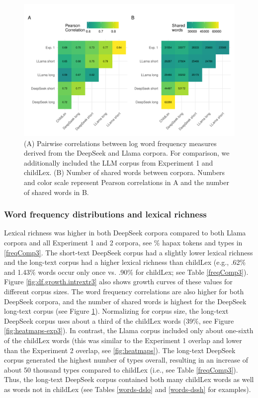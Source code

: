 \documentclass[doc, a4paper, anonymous]{apa7}
\begin{document}
\begin{figure}[!htbp]
  \centerline{
    \includegraphics[width=1.1\textwidth]{figures/combined_plotc_exp3.pdf}}
    \caption{(A) Pairwise correlations between log word frequency measures derived from the DeepSeek and Llama corpora. For comparison, we additionally included the LLM corpus from Experiment 1 and childLex. (B) Number of shared words between corpora. Numbers and color scale represent Pearson correlations in A and the number of shared words in B.}
    \label{fig:combined_plotc_exp3}
\end{figure}


\subsubsection*{Word frequency distributions and lexical richness}

Lexical richness was higher in both DeepSeek corpora compared to both Llama corpora and all Experiment 1 and 2 corpora, see \% hapax tokens and types in \ref{freqComp3}. The short-text DeepSeek corpus had a slightly lower lexical richness and the long-text corpus had a higher lexical richness than childLex (e.g., .62\% and 1.43\% words occur only once vs. .90\% for childLex; see Table \ref{freqComp3}). Figure \ref{fig:df.growth.intrextr3} also shows growth curves of these values for different corpus sizes. The word frequency correlations are also higher for both DeepSeek corpora, and the number of shared words is highest for the DeepSeek long-text corpus (see Figure \ref{fig:combined_plotc_exp3}). Normalizing for corpus size, the long-text DeepSeek corpus uses about a third of the childLex words (39\%, see Figure \ref{fig:heatmaps-exp3}). In contrast, the Llama corpus included only about one-sixth of the childLex words (this was similar to the Experiment 1 overlap and lower than the Experiment 2 overlap, see \ref{fig:heatmaps}). The long-text DeepSeek corpus generated the highest number of types overall, resulting in an increase of about 50 thousand types compared to childLex (i.e., see Table  \ref{freqComp3}). Thus, the long-text DeepSeek corpus contained both many childLex words as well as words not in childLex (see Tables \ref{words-dslo} and \ref{words-dssh} for examples). 
\end{document}
